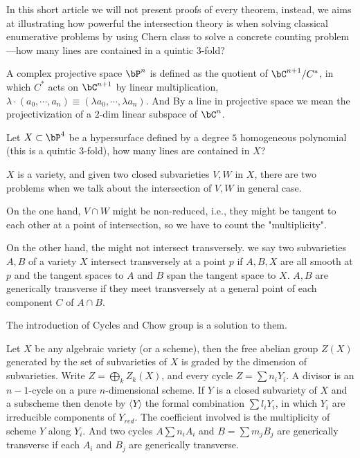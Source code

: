 \documentclass[a4paper, twoside]{article}
\begin{document}
In this short article we will not present proofs of every theorem, instead, we aims at illustrating how powerful the intersection theory is when solving classical enumerative problems by using Chern class to solve a concrete counting problem---how many lines are contained in a quintic $3$-fold?

\begin{dfn}
	A complex projective space $\bP^n$ is defined as the quotient of $\bC^{n+1}/C^*$, in which $C^*$ acts on $\bC^{n+1}$ by linear multiplication, $\lambda\cdot(a_0,\cdots,a_n)\equiv (\lambda a_0,\cdots, \lambda a_n)$. And By a line in projective space we mean the projectivization of a $2$-dim linear subspace of $\bC^n$.
\end{dfn}

\begin{prb}\label{count}
Let $X\subset\bP^4$ be a hypersurface defined by a degree $5$ homogeneous polynomial (this is a quintic $3$-fold), how many lines are contained in $X$? 
\end{prb}


$X$ is a variety, and given two closed subvarieties $V,W$ in $X$, there are two problems when we talk about the intersection of $V,W$ in general case.

On the one hand, $V\cap W$ might be non-reduced, i.e., they might be tangent to each other at a point of intersection, so we have to count the "multiplicity".

On the other hand, the might not intersect transversely. we say two subvarieties $A,B$ of a variety $X$ intersect transversely at a point $p$ if $A,B,X$ are all smooth at $p$ and the tangent spaces to $A$ and $B$ span the tangent space to $X$. $A,B$ are generically transverse if they meet transversely at a general point of each component $C$ of $A\cap B$.

The introduction of Cycles and Chow group is a solution to them.

Let $X$ be any algebraic variety (or a scheme), then the free abelian group $Z(X)$ generated by the set of subvarieties of $X$ is graded by the dimension of subvarieties. Write $Z=\bigoplus_kZ_k(X)$, and every cycle $Z=\sum n_iY_i$. A divisor is an $n-1$-cycle on a pure $n$-dimensional scheme. If $Y$ is a closed subvariety of $X$ and a subscheme then denote by $\langle Y\rangle$ the formal combination $\sum l_iY_i$, in which $Y_i$ are irreducible components of $Y_{red}$. The coefficient involved is the multiplicity of scheme $Y$ along $Y_i$. And two cycles $A\sum n_iA_i$ and $B=\sum m_jB_j$ are generically transverse if each $A_i$ and $B_j$ are generically transverse.
\end{document}
